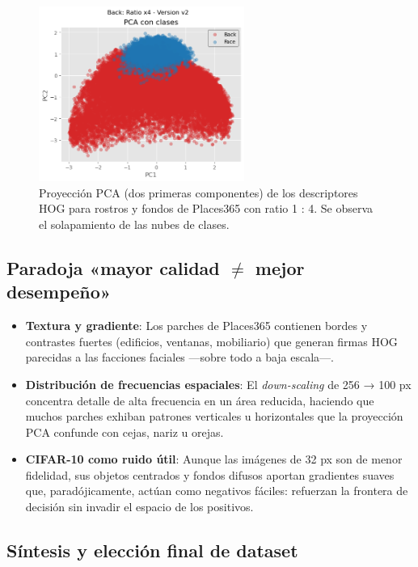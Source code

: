 \documentclass{article}
\begin{document}
\begin{figure}[H]
    \centering
    \includegraphics[width=0.6\textwidth]{tarea_1/imagenes/pca_x4_v2.png}
    \caption{Proyección PCA (dos primeras componentes) de los descriptores HOG para rostros y fondos de Places365 con ratio 1 : 4. Se observa el solapamiento de las nubes de clases.}
    \label{fig:pca_ratio4}
\end{figure}

\subsection*{Paradoja «mayor calidad $\neq$ mejor desempeño»}
\begin{itemize}
    \item \textbf{Textura y gradiente}: Los parches de Places365 contienen bordes y contrastes fuertes (edificios, ventanas, mobiliario) que generan firmas HOG parecidas a las facciones faciales —sobre todo a baja escala—.
    \item \textbf{Distribución de frecuencias espaciales}: El \textit{down-scaling} de 256 → 100 px concentra detalle de alta frecuencia en un área reducida, haciendo que muchos parches exhiban patrones verticales u horizontales que la proyección PCA confunde con cejas, nariz u orejas.
    \item \textbf{CIFAR-10 como ruido útil}: Aunque las imágenes de 32 px son de menor fidelidad, sus objetos centrados y fondos difusos aportan gradientes suaves que, paradójicamente, actúan como negativos fáciles: refuerzan la frontera de decisión sin invadir el espacio de los positivos.
\end{itemize}

\subsection*{Síntesis y elección final de dataset}
\end{document}
